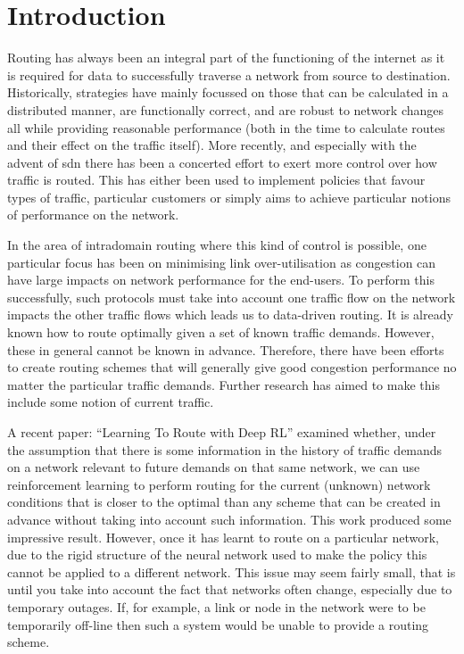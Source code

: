 \chapter{Introduction}

\setcounter{page}{1}

Routing has always been an integral part of the functioning of the internet as it is required for data to successfully traverse a network from source to destination. Historically, strategies have mainly focussed on those that can be calculated in a distributed manner, are functionally correct, and are robust to network changes all while providing reasonable performance (both in the time to calculate routes and their effect on the traffic itself). More recently, and especially with the advent of \ac{sdn} there has been a concerted effort to exert more control over how traffic is routed. This has either been used to implement policies that favour types of traffic, particular customers or simply aims to achieve particular notions of performance on the network.

In the area of intradomain routing where this kind of control is possible, one particular focus has been on minimising link over-utilisation as congestion can have large impacts on network performance for the end-users. To perform this successfully, such protocols must take into account one traffic flow on the network impacts the other traffic flows which leads us to data-driven routing. It is already known how to route optimally given a set of known traffic demands. However, these in general cannot be known in advance. Therefore, there have been efforts to create routing schemes that will generally give good congestion performance no matter the particular traffic demands. Further research has aimed to make this include some notion of current traffic.

A recent paper: ``Learning To Route with Deep RL''\cite{valadarsky2017learning} examined whether, under the assumption that there is some information in the history of traffic demands on a network relevant to future demands on that same network, we can use reinforcement learning to perform routing for the current (unknown) network conditions that is closer to the optimal than any scheme that can be created in advance without taking into account such information. This work produced some impressive result. However, once it has learnt to route on a particular network, due to the rigid structure of the neural network used to make the policy this cannot be applied to a different network. This issue may seem fairly small, that is until you take into account the fact that networks often change, especially due to temporary outages. If, for example, a link or node in the network were to be temporarily off-line then such a system would be unable to provide a routing scheme.

